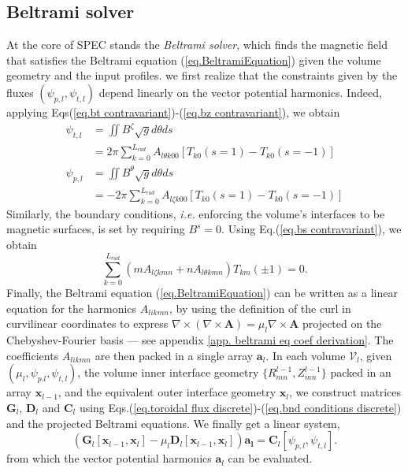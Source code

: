\documentclass[my_thesis.tex]{subfiles}
\begin{document}
\subsection{Beltrami solver} \label{spec beltrami solver}
At the core of SPEC stands the \emph{Beltrami solver}, which finds the magnetic field that satisfies the Beltrami equation (\ref{eq.BeltramiEquation}) given the volume geometry and the input profiles. we first realize that the constraints given by the fluxes $(\psi_{p,l},\psi_{t,l})$ depend linearly on the vector potential harmonics. Indeed, applying Eqs(\ref{eq.bt contravariant})-(\ref{eq.bz contravariant}), we obtain
\begin{align}
	\psi_{t,l} &= \iint B^\zeta \sqrt{g}d\theta ds\\
	&= 2\pi\sum_{k=0}^{L_{rad}} A_{l\theta k 0 0 } [T_{k0}(s=1)-T_{k0}(s=-1)] \label{eq.toroidal flux discrete}\\
	\psi_{p,l} &= \iint B^\theta \sqrt{g}d\theta ds\\
	&= -2\pi\sum_{k=0}^{L_{rad}} A_{l\zeta k 0 0 }[T_{k0}(s=1)-T_{k0}(s=-1)]\label{eq.poloidal flux discrete}
\end{align}
Similarly, the boundary conditions, \textit{i.e.} enforcing the volume's interfaces to be magnetic surfaces, is set by requiring $B^s=0$. Using Eq.(\ref{eq.bs contravariant}), we obtain
\begin{equation}
	\sum_{k=0}^{L_{rad}}(mA_{l\zeta k mn}+ n A_{l\theta k mn})T_{km}(\pm 1) = 0.\label{eq.bnd conditions discrete}
\end{equation}
Finally, the Beltrami equation (\ref{eq.BeltramiEquation}) can be written as a linear equation for the harmonics $A_{likmn}$, by using the definition of the curl in curvilinear coordinates to express $\nabla\times(\nabla\times\mathbf{A})=\mu_l\nabla\times\mathbf{A}$ projected on the Chebyshev-Fourier basis --- see appendix \ref{app. beltrami eq coef derivation}. The coefficients $A_{likmn}$ are then packed in a single array $\mathbf{a}_l$. In each volume $\mathcal{V}_l$, given $(\mu_l,\psi_{p.l},\psi_{t,l})$, the volume inner interface geometry $\{R^{l-1}_{mn},Z^{l-1}_{mn}\}$ packed in an array $\mathbf{x}_{l-1}$, and the equivalent outer interface geometry $\mathbf{x}_l$, we construct matrices $\mathbf{G}_l$, $\mathbf{D}_l$ and $\mathbf{C}_l$ using Eqs.(\ref{eq.toroidal flux discrete})-(\ref{eq.bnd conditions discrete}) and the projected Beltrami equations. We finally get a linear system,
\begin{equation}
	\left(\mathbf{G}_l[\mathbf{x}_{l-1},\mathbf{x}_l]-\mu_l\mathbf{D}_l[\mathbf{x}_{l-1},\mathbf{x}_l]\right)\mathbf{a_l} = \mathbf{C}_l[\psi_{p,l},\psi_{t,l}]. \label{eq.linearized_beltrami_system}
\end{equation}
from which the vector potential harmonics $\mathbf{a}_l$ can be evaluated.
\end{document}
